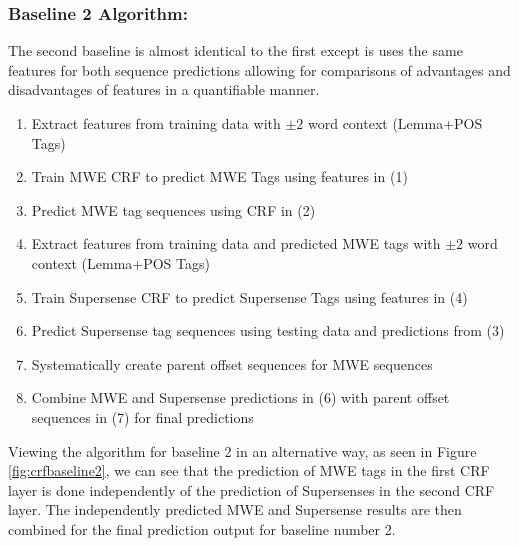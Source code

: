 \subsubsection{Baseline 2 Algorithm:}
The second baseline is almost identical to the first except is uses the same features for both sequence predictions allowing for comparisons of advantages and disadvantages of features in a quantifiable manner.

\begin{mdframed}[
    linewidth=0pt,
    roundcorner=4pt,
    backgroundcolor=gray!15,
    userdefinedwidth=\textwidth,
]
\begin{enumerate}
\tiny
  \setlength{\itemsep}{0pt}
  \setlength{\parskip}{0pt}
\item Extract features from training data with $\pm 2$ word context (Lemma+POS Tags)
\item Train MWE CRF to predict MWE Tags using features in (1)
\item Predict MWE tag sequences using CRF in (2)
\item Extract features from training data and predicted MWE tags with $\pm 2$ word context (Lemma+POS Tags)
\item Train Supersense CRF to predict Supersense Tags using features in (4)
\item Predict Supersense tag sequences using testing data and predictions from (3)
\item Systematically create parent offset sequences for MWE sequences
\item Combine MWE and Supersense predictions in (6) with parent offset sequences in (7) for final predictions
\end{enumerate}
\end{mdframed}

Viewing the algorithm for baseline 2 in an alternative way, as seen in Figure \ref{fig:crfbaseline2}, we can see that the prediction of MWE tags in the first CRF layer is done independently of the prediction of Supersenses in the second CRF layer. The independently predicted MWE and Supersense results are then combined for the final prediction output for baseline number 2.

